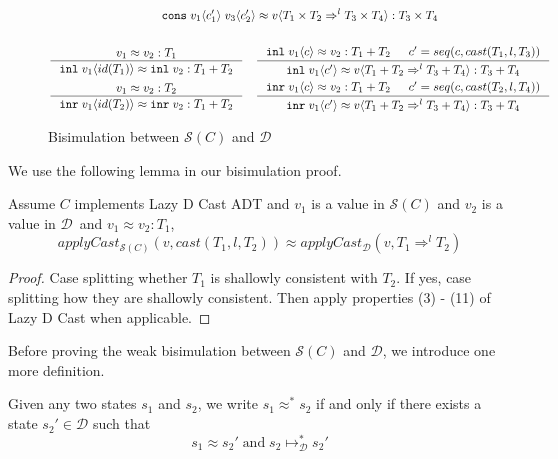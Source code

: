 \documentclass[acmsmall,review,anonymous]{acmart}\settopmatter{printfolios=true,printccs=false,printacmref=false}
\newcommand{\plus}[0]{+}
\newcommand{\POOprod}[2]{#1 \times #2}
\newcommand{\POOsum}[2]{#1 \plus #2}
\newcommand{\cOOcast}[3]{#1 \Rightarrow^{#2} #3}
\newcommand{\vOOcast}[2]{#1\langle#2\rangle}
\newcommand{\vOOinl}[1]{\mathtt{inl}\;#1}
\newcommand{\vOOinr}[1]{\mathtt{inr}\;#1}
\newcommand{\hcvOOcons}[4]{\mathtt{cons}\;#1\langle#2\rangle\;#3\langle#4\rangle}
\newcommand{\hcvOOinl}[2]{\mathtt{inl}\;#1\langle#2\rangle}
\newcommand{\hcvOOinr}[2]{\mathtt{inr}\;#1\langle#2\rangle}
\newcommand{\ineffCEKD}{$\mathcal{D}$}
\newcommand{\judgeDreduceTrans}[2]{#1 \longmapsto_{\mathcal{D}}^{*} #2}
\newcommand{\effCEK}[1]{$\mathcal{S}(#1)$}
\begin{document}
\begin{figure}
\begin{gather*}
{  }{
    \hcvOOcons{v_1}{c_1'}{v_3}{c_2'} \approx
    \vOOcast{v}{\cOOcast{\POOprod{T_1}{T_2}}{l}{\POOprod{T_3}{T_4}}}
    : \POOprod{T_3}{T_4}
  }
\\ \\
  \inference{
    v_1 \approx v_2 : T_1
  }{
    \hcvOOinl{v_1}{id(T_1)} \approx \vOOinl{v_2}
    : \POOsum{T_1}{T_2}
  }
  \quad
  \inference{
    \hcvOOinl{v_1}{c} \approx v_2
    : \POOsum{T_1}{T_2} &
    c' = seq(c,cast(T_1,l,T_3))
  }{
    \hcvOOinl{v_1}{c'} \approx
    \vOOcast{v}{\cOOcast{\POOsum{T_1}{T_2}}{l}{\POOsum{T_3}{T_4}}}
    : \POOsum{T_3}{T_4} 
  }
  \\
  \inference{
  v_1 \approx v_2 : T_2
  }{
  \hcvOOinr{v_1}{id(T_2)} \approx \vOOinr{v_2}
  : \POOsum{T_1}{T_2}
  }
  \quad
  \inference{
  \hcvOOinr{v_1}{c} \approx v_2
  : \POOsum{T_1}{T_2} &
  c' = seq(c,cast(T_2,l,T_4))
  }{
  \hcvOOinr{v_1}{c'} \approx
  \vOOcast{v}{\cOOcast{\POOsum{T_1}{T_2}}{l}{\POOsum{T_3}{T_4}}}
  : \POOsum{T_3}{T_4}
  }
  \end{gather*}
  \caption{Bisimulation between \effCEK{C} and \ineffCEKD}
  \label{fig:bisim-SC-D}
\end{figure}


We use the following lemma in our bisimulation proof.

\begin{lemma}[SoAndSo]
  \label{thm:lem-apply-cast-SD}
  Assume $C$ implements Lazy D Cast ADT
  and $v_1$ is a value in \effCEK{C}
  and $v_2$ is a value in \ineffCEKD\
  and $v_1 \approx v_2 : T_1$,
  \[
  applyCast_{\text{\effCEK{C}}}(v,cast(T_1,l,T_2)) 
  \approx 
  applyCast_{\text{\ineffCEKD}}(v,\cOOcast{T_1}{l}{T_2})
  \]
\end{lemma}
\begin{proof}
  Case splitting whether $T_1$ is shallowly consistent with $T_2$.
  If yes, case splitting how they are shallowly consistent.
  Then apply properties (3) - (11) of Lazy D Cast when applicable.
\end{proof}

Before proving the weak bisimulation between \effCEK{C} and \ineffCEKD, we 
introduce one more definition.

\begin{definition}[$s \approx^{*} s$]
Given any two states $s_1$ and $s_2$, we write $s_1 \approx^{*} s_2$
if and only if there exists a state $s_2' \in \text{\ineffCEKD}$ such
that
\[
s_1 \approx s_2'
\;\text{and}\;
\judgeDreduceTrans{s_2}{s_2'}
\]
\end{definition}
\end{document}
